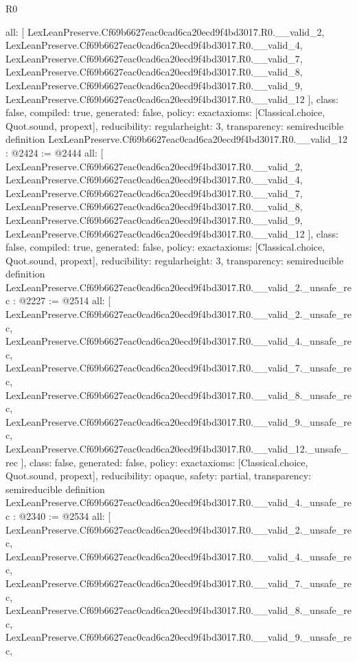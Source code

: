 \begin{lexlean}{R0}
\begin{coremodule}
{  all: [
    LexLeanPreserve.Cf69b6627eac0cad6ca20ecd9f4bd3017.R0.__valid_2,
    LexLeanPreserve.Cf69b6627eac0cad6ca20ecd9f4bd3017.R0.__valid_4,
    LexLeanPreserve.Cf69b6627eac0cad6ca20ecd9f4bd3017.R0.__valid_7,
    LexLeanPreserve.Cf69b6627eac0cad6ca20ecd9f4bd3017.R0.__valid_8,
    LexLeanPreserve.Cf69b6627eac0cad6ca20ecd9f4bd3017.R0.__valid_9,
    LexLeanPreserve.Cf69b6627eac0cad6ca20ecd9f4bd3017.R0.__valid_12
  ],
  class: false,
  compiled: true,
  generated: false,
  policy: exact{axioms: [Classical.choice, Quot.sound, propext]},
  reducibility: regular{height: 3},
  transparency: semireducible
}
definition LexLeanPreserve.Cf69b6627eac0cad6ca20ecd9f4bd3017.R0.__valid_12 : @2424 := @2444 {
  all: [
    LexLeanPreserve.Cf69b6627eac0cad6ca20ecd9f4bd3017.R0.__valid_2,
    LexLeanPreserve.Cf69b6627eac0cad6ca20ecd9f4bd3017.R0.__valid_4,
    LexLeanPreserve.Cf69b6627eac0cad6ca20ecd9f4bd3017.R0.__valid_7,
    LexLeanPreserve.Cf69b6627eac0cad6ca20ecd9f4bd3017.R0.__valid_8,
    LexLeanPreserve.Cf69b6627eac0cad6ca20ecd9f4bd3017.R0.__valid_9,
    LexLeanPreserve.Cf69b6627eac0cad6ca20ecd9f4bd3017.R0.__valid_12
  ],
  class: false,
  compiled: true,
  generated: false,
  policy: exact{axioms: [Classical.choice, Quot.sound, propext]},
  reducibility: regular{height: 3},
  transparency: semireducible
}
definition LexLeanPreserve.Cf69b6627eac0cad6ca20ecd9f4bd3017.R0.__valid_2._unsafe_rec : @2227 := @2514 {
  all: [
    LexLeanPreserve.Cf69b6627eac0cad6ca20ecd9f4bd3017.R0.__valid_2._unsafe_rec,
    LexLeanPreserve.Cf69b6627eac0cad6ca20ecd9f4bd3017.R0.__valid_4._unsafe_rec,
    LexLeanPreserve.Cf69b6627eac0cad6ca20ecd9f4bd3017.R0.__valid_7._unsafe_rec,
    LexLeanPreserve.Cf69b6627eac0cad6ca20ecd9f4bd3017.R0.__valid_8._unsafe_rec,
    LexLeanPreserve.Cf69b6627eac0cad6ca20ecd9f4bd3017.R0.__valid_9._unsafe_rec,
    LexLeanPreserve.Cf69b6627eac0cad6ca20ecd9f4bd3017.R0.__valid_12._unsafe_rec
  ],
  class: false,
  generated: false,
  policy: exact{axioms: [Classical.choice, Quot.sound, propext]},
  reducibility: opaque{},
  safety: partial,
  transparency: semireducible
}
definition LexLeanPreserve.Cf69b6627eac0cad6ca20ecd9f4bd3017.R0.__valid_4._unsafe_rec : @2340 := @2534 {
  all: [
    LexLeanPreserve.Cf69b6627eac0cad6ca20ecd9f4bd3017.R0.__valid_2._unsafe_rec,
    LexLeanPreserve.Cf69b6627eac0cad6ca20ecd9f4bd3017.R0.__valid_4._unsafe_rec,
    LexLeanPreserve.Cf69b6627eac0cad6ca20ecd9f4bd3017.R0.__valid_7._unsafe_rec,
    LexLeanPreserve.Cf69b6627eac0cad6ca20ecd9f4bd3017.R0.__valid_8._unsafe_rec,
    LexLeanPreserve.Cf69b6627eac0cad6ca20ecd9f4bd3017.R0.__valid_9._unsafe_rec,
}
\end{coremodule}
\end{lexlean}
